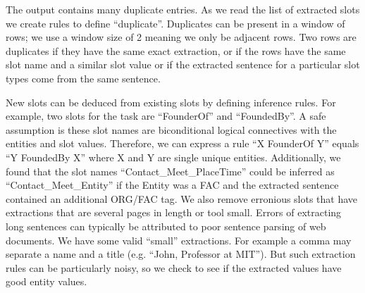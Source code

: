 The output contains many duplicate entries. As we read the list of extracted 
slots we create rules to define ``duplicate''. Duplicates can be present in a 
window of rows; we use a window size of 2 meaning we only be adjacent rows. 
Two rows are duplicates if they have the same exact extraction, or if the 
rows have the same slot name and a similar slot value or if the extracted 
sentence for a particular slot types come from the same sentence.

 New slots can be deduced from existing slots by defining inference rules. 
 For example, two slots for the task are ``FounderOf'' and ``FoundedBy''. A safe 
 assumption is these slot names are biconditional logical connectives with the 
 entities and slot values. Therefore, we can express a rule ``X FounderOf Y'' 
 equals ``Y FoundedBy X'' where X and Y are single unique entities. Additionally,
 we found that the slot names ``Contact\_Meet\_PlaceTime'' could be inferred as
 ``Contact\_Meet\_Entity'' if the Entity was a FAC and the extracted sentence 
 contained an additional ORG/FAC tag.  
We also remove erronious slots that have extractions that are several pages in 
length or tool small. Errors of extracting long sentences can typically be 
attributed to poor sentence parsing of web documents. We have some valid
``small'' extractions. For example a comma may separate a name and a title
(e.g. ``John, Professor at MIT''). But such extraction rules can be particularly 
noisy, so we check to see if the extracted values have good entity values.




